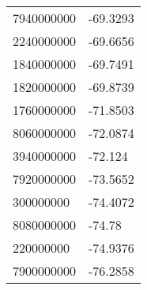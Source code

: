 \begin{tabular}{ll}
7940000000 & -69.3293 \\ 
2240000000 & -69.6656 \\ 
1840000000 & -69.7491 \\ 
1820000000 & -69.8739 \\ 
1760000000 & -71.8503 \\ 
8060000000 & -72.0874 \\ 
3940000000 & -72.124 \\ 
7920000000 & -73.5652 \\ 
300000000 & -74.4072 \\ 
8080000000 & -74.78 \\ 
220000000 & -74.9376 \\ 
7900000000 & -76.2858 \\ 
\hline 
\end{tabular}